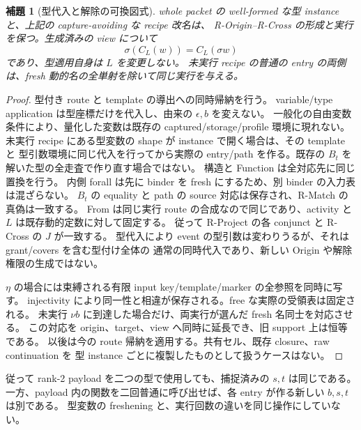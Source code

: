 \documentclass[11pt,a4paper]{article}
\newtheorem{lemma}[definition]{補題}
\begin{document}
\begin{lemma}[型代入と解除の可換図式]
\label{lem:release-substitution}
whole packet の well-formed な型 instance と、上記の capture-avoiding な recipe 改名は、
R-Origin--R-Cross の形成と実行を保つ。生成済みの view について
\[
 \sigma(C_L(w))=C_L(\sigma w)
 \tag{R-Subst}
\]
であり、型適用自身は \(L\) を変更しない。
未実行 recipe の普通の entry の両側は、fresh 動的名の全単射を除いて同じ実行を与える。
\end{lemma}
\begin{proof}
型付き route と template の導出への同時帰納を行う。
variable/type application は型座標だけを代入し、由来の \(\epsilon,b\) を変えない。
一般化の自由変数条件により、量化した変数は既存の captured/storage/profile 環境に現れない。
未実行 recipe にある型変数の shape が instance で開く場合は、その template と
型引数環境に同じ代入を行ってから実際の entry/path を作る。既存の \(B_t\) を
解いた型の全走査で作り直す場合ではない。
構造と Function は全対応先に同じ置換を行う。
内側 forall は先に binder を fresh にするため、別 binder の入力表は混ざらない。
\(B_t\) の equality と path の source 対応は保存され、R-Match の真偽は一致する。
From は同じ実行 route の合成なので同じであり、activity と \(L\) は既存動的定数に対して固定する。
従って R-Project の各 conjunct と R-Cross の \(J\) が一致する。
型代入により event の型引数は変わりうるが、それは grant/covers を含む型付け全体の
通常の同時代入であり、新しい Origin や解除権限の生成ではない。

\(\eta\) の場合には束縛される有限 input key/template/marker の全参照を同時に写す。
injectivity により同一性と相違が保存される。free な実際の受領表は固定される。
未実行 \(\nu b\) に到達した場合だけ、両実行が選んだ fresh 名同士を対応させる。
この対応を origin、target、view へ同時に延長でき、旧 support 上は恒等である。
以後は今の route 帰納を適用する。共有セル、既存 closure、raw continuation を
型 instance ごとに複製したものとして扱うケースはない。
\end{proof}

従って rank-2 payload を二つの型で使用しても、捕捉済みの \(s,t\) は同じである。
一方、payload 内の関数を二回普通に呼び出せば、各 entry が作る新しい \(b,s,t\) は別である。
型変数の freshening と、実行回数の違いを同じ操作にしていない。
\end{document}
